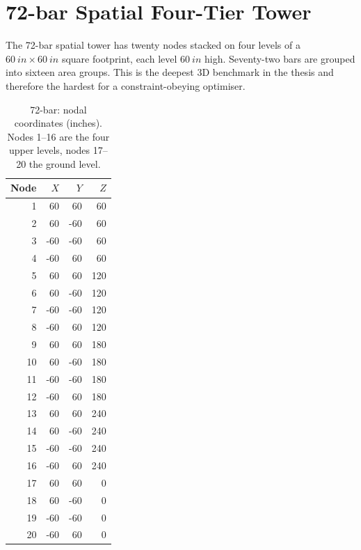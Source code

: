 \section{72-bar Spatial Four-Tier Tower}
\label{app:geom:72bar}

The 72-bar spatial tower has twenty nodes stacked on four levels
of a $\SI{60}{in}\times\SI{60}{in}$ square footprint, each level
$\SI{60}{in}$ high. Seventy-two bars are grouped into sixteen
area groups. This is the deepest 3D benchmark in the thesis and
therefore the hardest for a constraint-obeying optimiser.

\begin{table}[h]
  \centering
  \small
  \caption{72-bar: nodal coordinates (inches). Nodes 1--16 are
    the four upper levels, nodes 17--20 the ground level.}
  \label{tab:geom:72bar:nodes}
  \begin{tabular}{rrrr}
  \toprule
  Node & $X$ & $Y$ & $Z$ \\
  \midrule
  1 & 60 & 60 & 60 \\ 2 & 60 & -60 & 60 \\
  3 & -60 & -60 & 60 \\ 4 & -60 & 60 & 60 \\
  5 & 60 & 60 & 120 \\ 6 & 60 & -60 & 120 \\
  7 & -60 & -60 & 120 \\ 8 & -60 & 60 & 120 \\
  9 & 60 & 60 & 180 \\ 10 & 60 & -60 & 180 \\
  11 & -60 & -60 & 180 \\ 12 & -60 & 60 & 180 \\
  13 & 60 & 60 & 240 \\ 14 & 60 & -60 & 240 \\
  15 & -60 & -60 & 240 \\ 16 & -60 & 60 & 240 \\
  17 & 60 & 60 & 0 \\ 18 & 60 & -60 & 0 \\
  19 & -60 & -60 & 0 \\ 20 & -60 & 60 & 0 \\
  \bottomrule
  \end{tabular}
\end{table}

